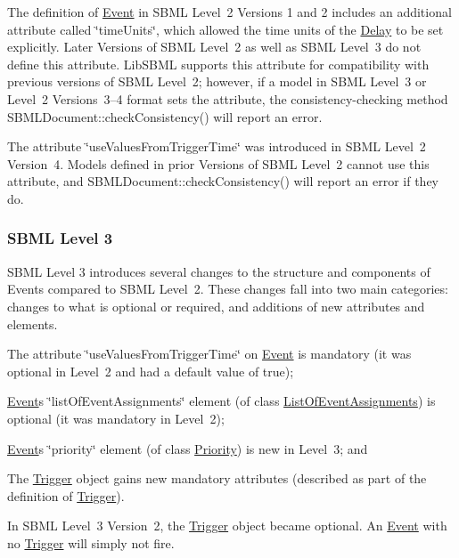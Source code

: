 The definition of \hyperlink{class_event}{Event} in S\+B\+ML Level~2 Versions 1 and 2 includes an additional attribute called \char`\"{}time\+Units\char`\"{}, which allowed the time units of the \hyperlink{class_delay}{Delay} to be set explicitly. Later Versions of S\+B\+ML Level~2 as well as S\+B\+ML Level~3 do not define this attribute. Lib\+S\+B\+ML supports this attribute for compatibility with previous versions of S\+B\+ML Level~2; however, if a model in S\+B\+ML Level~3 or Level~2 Versions~3--4 format sets the attribute, the consistency-\/checking method S\+B\+M\+L\+Document\+::check\+Consistency() will report an error.

The attribute \char`\"{}use\+Values\+From\+Trigger\+Time\char`\"{} was introduced in S\+B\+ML Level~2 Version~4. Models defined in prior Versions of S\+B\+ML Level~2 cannot use this attribute, and S\+B\+M\+L\+Document\+::check\+Consistency() will report an error if they do.\hypertarget{class_event_sbml-l3}{}\subsubsection{S\+B\+M\+L Level 3}\label{class_event_sbml-l3}
S\+B\+ML Level 3 introduces several changes to the structure and components of Events compared to S\+B\+ML Level~2. These changes fall into two main categories\+: changes to what is optional or required, and additions of new attributes and elements. 
\begin{DoxyItemize}
\item The attribute \char`\"{}use\+Values\+From\+Trigger\+Time\char`\"{} on \hyperlink{class_event}{Event} is mandatory (it was optional in Level~2 and had a default value of {\ttfamily true}); 
\item \hyperlink{class_event}{Event}\textquotesingle{}s \char`\"{}list\+Of\+Event\+Assignments\char`\"{} element (of class \hyperlink{class_list_of_event_assignments}{List\+Of\+Event\+Assignments}) is optional (it was mandatory in Level~2); 
\item \hyperlink{class_event}{Event}\textquotesingle{}s \char`\"{}priority\char`\"{} element (of class \hyperlink{class_priority}{Priority}) is new in Level~3; and 
\item The \hyperlink{class_trigger}{Trigger} object gains new mandatory attributes (described as part of the definition of \hyperlink{class_trigger}{Trigger}). 
\item In S\+B\+ML Level~3 Version~2, the \hyperlink{class_trigger}{Trigger} object became optional. An \hyperlink{class_event}{Event} with no \hyperlink{class_trigger}{Trigger} will simply not fire. 
\end{DoxyItemize}

